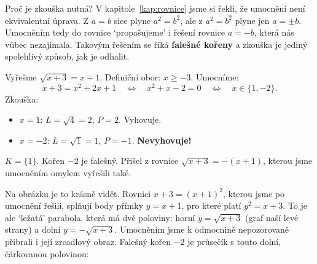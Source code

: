 Proč je zkouška nutná? V kapitole~\ref{kap:rovnice} jsme si řekli, že umocnění není ekvivalentní úprava. Z $a = b$ sice plyne $a^2 = b^2$, ale z $a^2 = b^2$ plyne jen $a = \pm b$. Umocněním tedy do rovnice `propašujeme' i řešení rovnice $a = -b$, která nás vůbec nezajímala. Takovým řešením se říká \textbf{falešné kořeny} a zkouška je jediný spolehlivý způsob, jak je odhalit.

\begin{example}
  Vyřešme $\sqrt{x + 3} = x + 1$. Definiční obor: $x\geq -3$. Umocníme:
  \begin{equation*}
    x + 3 = x^2 + 2x + 1\quad\Leftrightarrow\quad x^2 + x - 2 = 0\quad\Leftrightarrow\quad x\in\{1, -2\}.
  \end{equation*}
  Zkouška:
  \begin{itemize}
    \item $x = 1$: $L = \sqrt{4} = 2$, $P = 2$. Vyhovuje.
    \item $x = -2$: $L = \sqrt{1} = 1$, $P = -1$. \textbf{Nevyhovuje!}
  \end{itemize}
  $K = \{1\}$. Kořen $-2$ je falešný. Přišel z rovnice $\sqrt{x + 3} = -(x + 1)$, kterou jsme umocněním omylem vyřešili také.
\end{example}

Na obrázku je to krásně vidět. Rovnici $x + 3 = {(x + 1)}^2$, kterou jsme po umocnění řešili, splňují body přímky $y = x + 1$, pro které platí $y^2 = x + 3$. To je ale `ležatá' parabola, která má dvě poloviny: horní $y = \sqrt{x + 3}$ (graf naší levé strany) a dolní $y = -\sqrt{x + 3}$. Umocněním jsme k odmocnině nepozorovaně přibrali i její zrcadlový obraz. Falešný kořen $-2$ je průsečík s touto dolní, čárkovanou polovinou:
\begin{center}
\end{center}

